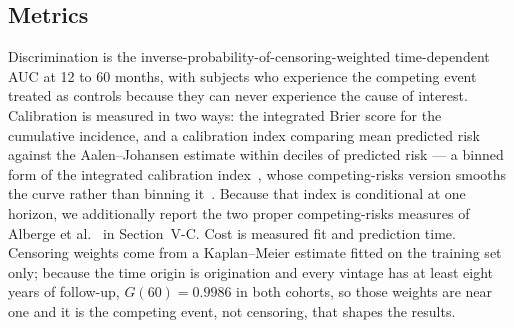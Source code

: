 \documentclass[11pt,journal]{IEEEtran}
\begin{document}
\subsection{Metrics}
Discrimination is the inverse-probability-of-censoring-weighted time-dependent
AUC at 12 to 60 months, with subjects who experience the competing event treated
as controls because they can never experience the cause of interest. Calibration
is measured in two ways: the integrated Brier score for the cumulative incidence,
and a calibration index comparing mean predicted risk against the
Aalen--Johansen estimate within deciles of predicted risk --- a binned form of
the integrated calibration index~\cite{austin2019ici}, whose competing-risks
version smooths the curve rather than binning it~\cite{austin2022icicr}. Because
that index is conditional at one horizon, we additionally report the two proper
competing-risks measures of Alberge et al.~\cite{alberge2026calibration} in
Section~V-C. Cost is measured fit and prediction time. Censoring weights come from a Kaplan--Meier
estimate fitted on the training set only; because the time origin is origination
and every vintage has at least eight years of follow-up, $G(60)=0.9986$ in both
cohorts, so those weights are near one and it is the competing event, not
censoring, that shapes the results.
\end{document}
